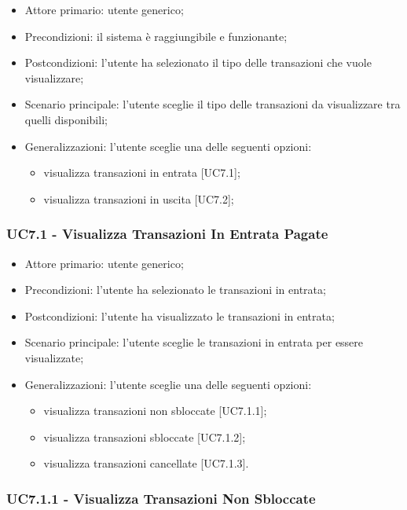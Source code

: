 \begin{itemize}
    \item Attore primario: utente generico;
    \item Precondizioni: il sistema è raggiungibile e funzionante;
    \item Postcondizioni: l'utente ha selezionato il tipo delle transazioni che vuole visualizzare;
    \item Scenario principale: l'utente sceglie il tipo delle transazioni da visualizzare tra quelli disponibili;
    \item Generalizzazioni: l'utente sceglie una delle seguenti opzioni:
    \begin{itemize}
        \item visualizza transazioni in entrata [UC7.1];
        \item visualizza transazioni in uscita [UC7.2];
    \end{itemize}
\end{itemize}

\subsubsection{UC7.1 - Visualizza Transazioni In Entrata Pagate}

\begin{itemize}
    \item Attore primario: utente generico;
    \item Precondizioni: l'utente ha selezionato le transazioni in entrata;
    \item Postcondizioni: l'utente ha visualizzato le transazioni in entrata;
    \item Scenario principale: l'utente sceglie le transazioni in entrata per essere visualizzate;
    \item Generalizzazioni: l'utente sceglie una delle seguenti opzioni:
    \begin{itemize}
        \item visualizza transazioni non sbloccate [UC7.1.1];
        \item visualizza transazioni sbloccate [UC7.1.2];
        \item visualizza transazioni cancellate [UC7.1.3].
    \end{itemize}
\end{itemize}

\subsubsection{UC7.1.1 - Visualizza Transazioni Non Sbloccate}

